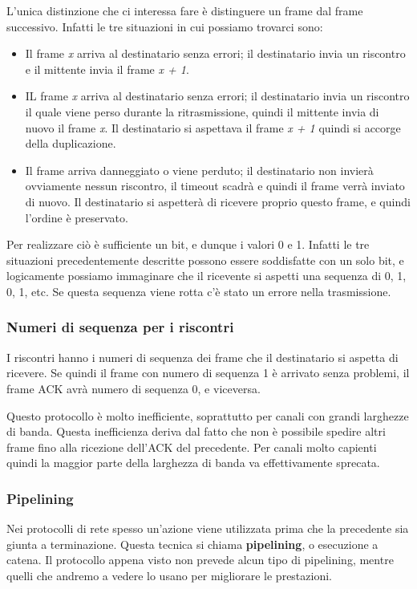             L'unica distinzione che ci interessa fare è distinguere un frame dal frame successivo. Infatti le tre situazioni in cui possiamo trovarci sono:
            \begin{itemize}
                \item Il frame \textit{x} arriva al destinatario senza errori; il destinatario invia un riscontro e il mittente invia il frame \textit{x + 1}.
                
                \item IL frame \textit{x} arriva al destinatario senza errori; il destinatario invia un riscontro il quale viene perso durante la ritrasmissione, quindi il mittente invia di nuovo il frame \textit{x}. Il destinatario si aspettava il frame \textit{x + 1} quindi si accorge della duplicazione.
                
                \item Il frame arriva danneggiato o viene perduto; il destinatario non invierà ovviamente nessun riscontro, il timeout scadrà e quindi il frame verrà inviato di nuovo. Il destinatario si aspetterà di ricevere proprio questo frame, e quindi l'ordine è preservato.
            \end{itemize}
            
            Per realizzare ciò è sufficiente un bit, e dunque i valori 0 e 1. Infatti le tre situazioni precedentemente descritte possono essere soddisfatte con un solo bit, e logicamente possiamo immaginare che il ricevente si aspetti una sequenza di 0, 1, 0, 1, etc. Se questa sequenza viene rotta c'è stato un errore nella trasmissione.
            
        \subsubsection{Numeri di sequenza per i riscontri}
            I riscontri hanno i numeri di sequenza dei frame che il destinatario si aspetta di ricevere. Se quindi il frame con numero di sequenza 1 è arrivato senza problemi, il frame ACK avrà numero di sequenza 0, e viceversa.
            
        Questo protocollo è molto inefficiente, soprattutto per canali con grandi larghezze di banda. Questa inefficienza deriva dal fatto che non è possibile spedire altri frame fino alla ricezione dell'ACK del precedente. Per canali molto capienti quindi la maggior parte della larghezza di banda va effettivamente sprecata.
        
        \subsubsection{Pipelining}
            Nei protocolli di rete spesso un'azione viene utilizzata prima che la precedente sia giunta a terminazione. Questa tecnica si chiama \textbf{pipelining}, o esecuzione a catena. Il protocollo appena visto non prevede alcun tipo di pipelining, mentre quelli che andremo a vedere lo usano per migliorare le prestazioni.
            
